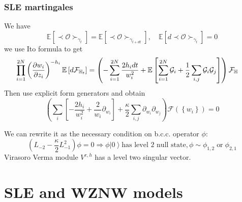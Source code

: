 \documentclass[pdftex]{beamer}
\theoremstyle{definition} \newtheorem{Def}{Definition}
\begin{document}
\begin{frame}
  \frametitle{SLE martingales}
  We have
  \begin{equation*}
    \mathbb{E}\left[\prec\mathcal{O}\succ_{\gamma_{t}}\right]=    \mathbb{E}\left[\prec\mathcal{O}\succ_{\gamma_{t+dt}}\right], \quad \mathbb{E}\left[d \prec\mathcal{O}\succ_{\gamma_{t}}\right]=0
  \end{equation*}
  we use Ito formula to get
  \begin{equation*}
\hspace{-0.5cm}    \prod_{i=1}^{2N}\left(\frac{\partial w_{i}}{\partial z_{i}}\right)^{-h_{i}}\mathbb{E}\left[d 
      \mathcal{F}_{\mathbb{H}_{t}}\right]=\left(-\sum_{i=1}^{2N}\frac{2h_{i}dt}{w_{i}^{2}}+\mathbb{E}\left[\sum_{i=1}^{2N}\mathcal{G}_{i}+\frac{1}{2}
        \sum_{i,j}\mathcal{G}_{i}\mathcal{G}_{j}\right]\right)\mathcal{F}_{\mathbb{H}}
  \end{equation*}
  Then use explicit form generators and obtain
  \begin{equation*}
    \left( \sum_{i}\left[-\frac{2h_{i}}{w_{i}^{2}} +\frac{2}{w_{i}}\partial_{w_{i}}\right]+\frac{\kappa}{2}\sum_{i,j}\partial_{w_{i}} \partial_{w_{j}}\right)\mathcal{F}(\left\{w_{i}\right\})=0
  \end{equation*}

  We can rewrite it as the necessary condition on b.c.c. operator $\phi$:
  \begin{equation*}
    (L_{-2}-\frac{\kappa}{2}L_{-1}^{2})\phi=0 \Longrightarrow \phi \left|0\right>  \text{has level 2 null state}, \phi\sim \phi_{1,2} \;\text{or}\; \phi_{2,1}
  \end{equation*}
  Virasoro Verma module $V^{c,h}$ has a level two singular vector.
\end{frame}

\section{SLE and WZNW models}
\label{sec:sle-wzw-models}
\end{document}
